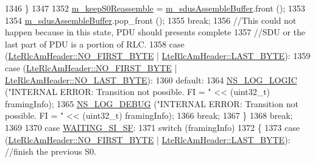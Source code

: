 \begin{DoxyCode}
1346                                 \}
1347 
1352                               \hyperlink{classns3_1_1LteRlcAm_ab3240ea3468d9b515fc38e717273d3bd}{m\_keepS0Reassemble} = 
      \hyperlink{classns3_1_1LteRlcAm_a075262ee7d8d49e97ab0c48b5e763bf1}{m\_sdusAssembleBuffer}.front ();
1353 
1354                               \hyperlink{classns3_1_1LteRlcAm_a075262ee7d8d49e97ab0c48b5e763bf1}{m\_sdusAssembleBuffer}.pop\_front ();
1355                       \textcolor{keywordflow}{break};
1356                       \textcolor{comment}{//This could not happen because in this state, PDU should presents complete }
1357                       \textcolor{comment}{//SDU or the last part of PDU is a portion of RLC.}
1358                       \textcolor{keywordflow}{case} (\hyperlink{classns3_1_1LteRlcAmHeader_af42d22f1202bd0d8fa1f4cd0494b8b29a32b741f4f0b7c331632c185341ac9cb4}{LteRlcAmHeader::NO\_FIRST\_BYTE} | 
      \hyperlink{classns3_1_1LteRlcAmHeader_af0fb4ccf208128c7cf9dcabf02593749afae5968023949559fdf8d8ad9feb81cd}{LteRlcAmHeader::LAST\_BYTE}):
1359                       \textcolor{keywordflow}{case} (\hyperlink{classns3_1_1LteRlcAmHeader_af42d22f1202bd0d8fa1f4cd0494b8b29a32b741f4f0b7c331632c185341ac9cb4}{LteRlcAmHeader::NO\_FIRST\_BYTE} | 
      \hyperlink{classns3_1_1LteRlcAmHeader_af0fb4ccf208128c7cf9dcabf02593749af3f3cbb1727324b59b486aa955ce28f8}{LteRlcAmHeader::NO\_LAST\_BYTE}):
1360                       \textcolor{keywordflow}{default}:
1364                               \hyperlink{group__logging_ga88acd260151caf2db9c0fc84997f45ce}{NS\_LOG\_LOGIC} (\textcolor{stringliteral}{"INTERNAL ERROR: Transition not possible. FI = "} <<
       (uint32\_t) framingInfo);
1365                               \hyperlink{group__logging_ga413f1886406d49f59a6a0a89b77b4d0a}{NS\_LOG\_DEBUG} (\textcolor{stringliteral}{"INTERNAL ERROR: Transition not possible. FI = "} <<
       (uint32\_t) framingInfo);
1366                       \textcolor{keywordflow}{break};
1367                     \}
1368           \textcolor{keywordflow}{break};
1369 
1370           \textcolor{keywordflow}{case} \hyperlink{classns3_1_1LteRlcAm_a43eeebdccf778e2247c956481ed03d62a967f9c81a213f824b6a908bdfc1a7e4e}{WAITING\_SI\_SF}:
1371                   \textcolor{keywordflow}{switch} (framingInfo)
1372                     \{
1373                       \textcolor{keywordflow}{case} (\hyperlink{classns3_1_1LteRlcAmHeader_af42d22f1202bd0d8fa1f4cd0494b8b29a32b741f4f0b7c331632c185341ac9cb4}{LteRlcAmHeader::NO\_FIRST\_BYTE} | 
      \hyperlink{classns3_1_1LteRlcAmHeader_af0fb4ccf208128c7cf9dcabf02593749afae5968023949559fdf8d8ad9feb81cd}{LteRlcAmHeader::LAST\_BYTE}): \textcolor{comment}{//finish the previous S0.}

\end{DoxyCode}
